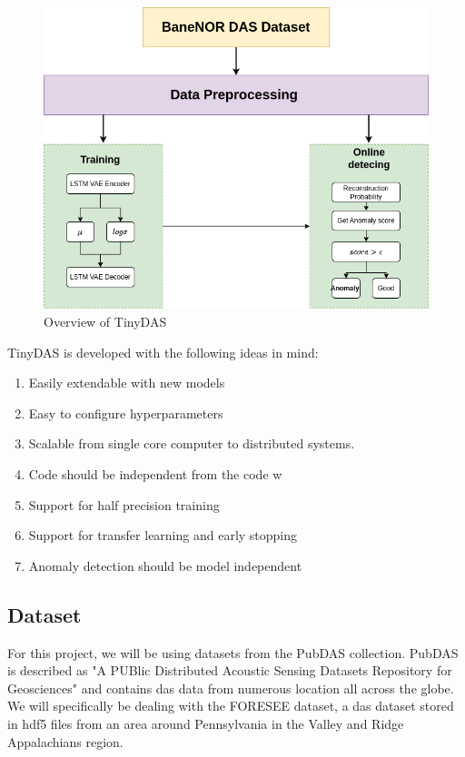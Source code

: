 \begin{figure}[!h]
    \centering
    \includegraphics[scale=0.5]{figures/methodflow.png}
    \caption{Overview of TinyDAS}
    \label{fig:dataflow}
\end{figure}

TinyDAS is developed with the following ideas in mind:

\begin{enumerate}
    \item Easily extendable with new models
    \item Easy to configure hyperparameters
    \item Scalable from single core computer to distributed systems.
    \item Code should be independent from the code w
    \item Support for half precision training
    \item Support for transfer learning and early stopping
    \item Anomaly detection should be model independent
\end{enumerate}

\subsection{Dataset}

For this project, we will be using datasets from the PubDAS \cite{spica2023pubdas} collection. PubDAS is described as "A PUBlic Distributed Acoustic Sensing Datasets Repository for Geosciences" and contains \acrshort{das} data from numerous location all across the globe. We will specifically be dealing with the FORESEE dataset, a \acrshort{das} dataset stored in \acrshort{hdf5} files from an area around Pennsylvania in the Valley and Ridge Appalachians region. \\

